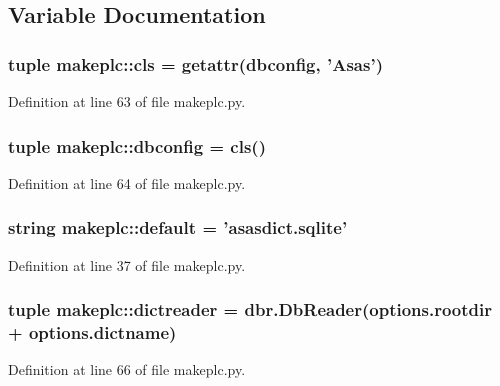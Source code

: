 \subsection{Variable Documentation}
\hypertarget{namespacemakeplc_aa363cd785ab9133a4d9130ea47440558}{
\subsubsection[{cls}]{\setlength{\rightskip}{0pt plus 5cm}tuple {\bf makeplc::cls} = getattr({\bf dbconfig}, 'Asas')}}
\label{namespacemakeplc_aa363cd785ab9133a4d9130ea47440558}


Definition at line 63 of file makeplc.py.

\hypertarget{namespacemakeplc_aa325dc07aa5dad58f7a5a218990db561}{
\subsubsection[{dbconfig}]{\setlength{\rightskip}{0pt plus 5cm}tuple {\bf makeplc::dbconfig} = {\bf cls}()}}
\label{namespacemakeplc_aa325dc07aa5dad58f7a5a218990db561}


Definition at line 64 of file makeplc.py.

\hypertarget{namespacemakeplc_ad959572cd67a037ec770664dbb029f57}{
\subsubsection[{default}]{\setlength{\rightskip}{0pt plus 5cm}string {\bf makeplc::default} = 'asasdict.sqlite'}}
\label{namespacemakeplc_ad959572cd67a037ec770664dbb029f57}


Definition at line 37 of file makeplc.py.

\hypertarget{namespacemakeplc_ad8e5963c381ce077742f668aeef37804}{
\subsubsection[{dictreader}]{\setlength{\rightskip}{0pt plus 5cm}tuple {\bf makeplc::dictreader} = dbr.DbReader(options.rootdir + options.dictname)}}
\label{namespacemakeplc_ad8e5963c381ce077742f668aeef37804}


Definition at line 66 of file makeplc.py.

